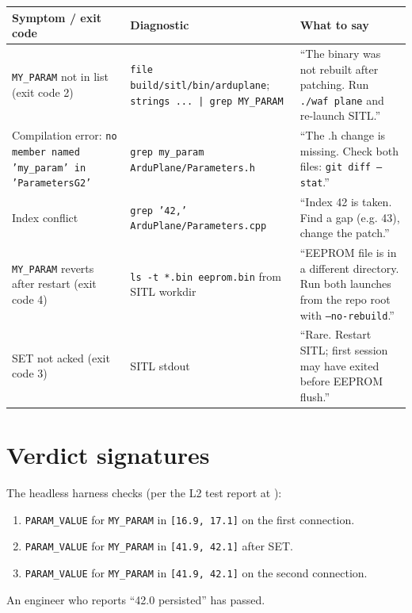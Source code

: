 \documentclass[a4paper,11pt,twoside]{article}
\begin{document}
\begin{center}\footnotesize
\begin{tabular}{|p{4.5cm}|p{4.0cm}|p{6.0cm}|}\hline
\textbf{Symptom / exit code} & \textbf{Diagnostic} & \textbf{What to say} \\ \hline
\texttt{MY\_PARAM} not in list (exit code 2) & \texttt{file build/sitl/bin/arduplane}; \texttt{strings ... | grep MY\_PARAM} & ``The binary was not rebuilt after patching. Run \texttt{./waf plane} and re-launch SITL.'' \\ \hline
Compilation error: \texttt{no member named 'my\_param' in 'ParametersG2'} & \texttt{grep my\_param ArduPlane/Parameters.h} & ``The .h change is missing. Check both files: \texttt{git diff --stat}.'' \\ \hline
Index conflict & \texttt{grep '42,' ArduPlane/Parameters.cpp} & ``Index 42 is taken. Find a gap (e.g. 43), change the patch.'' \\ \hline
\texttt{MY\_PARAM} reverts after restart (exit code 4) & \texttt{ls -t *.bin eeprom.bin} from SITL workdir & ``EEPROM file is in a different directory. Run both launches from the repo root with \texttt{--no-rebuild}.'' \\ \hline
SET not acked (exit code 3) & SITL stdout & ``Rare. Restart SITL; first session may have exited before EEPROM flush.'' \\ \hline
\end{tabular}
\end{center}

\section*{Verdict signatures}

The headless harness checks (per the L2 test report at ):

\begin{enumerate}
  \item \texttt{PARAM\_VALUE} for \texttt{MY\_PARAM} in \texttt{[16.9, 17.1]} on the first connection.
  \item \texttt{PARAM\_VALUE} for \texttt{MY\_PARAM} in \texttt{[41.9, 42.1]} after SET.
  \item \texttt{PARAM\_VALUE} for \texttt{MY\_PARAM} in \texttt{[41.9, 42.1]} on the second connection.
\end{enumerate}

An engineer who reports ``42.0 persisted'' has passed.
\end{document}
